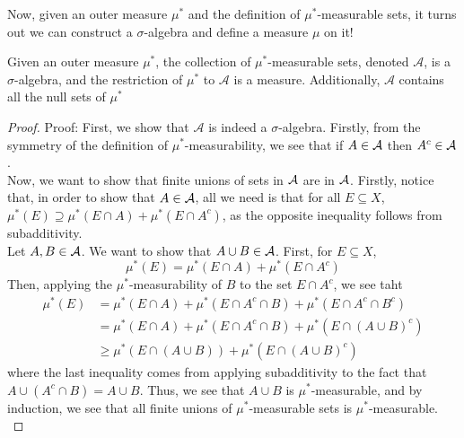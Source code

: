 
Now, given an outer measure $\mu^{*}$ and the definition of $\mu^{*}$-measurable sets, it turns out we can construct a $\sigma$-algebra and define a measure $\mu$ on it!

\begin{theorem}
    Given an outer measure $\mu^{*}$, the collection of $\mu^{*}$-measurable sets, denoted $\mathcal{A}$, is a $\sigma$-algebra, and the restriction of $\mu^{*}$ to $\mathcal{A}$ is a measure. Additionally, $\mathcal{A}$ contains all the null sets of $\mu^{*}$
\end{theorem}
\begin{proof}{Proof:}
    First, we show that $\mathcal{A}$ is indeed a $\sigma$-algebra. Firstly, from the symmetry of the definition of $\mu^{*}$-measurability, we see that if $A \in \cal{A}$ then $A^{c} \in \cal{A}$.\\
    
    Now, we want to show that finite unions of sets in $\cal{A}$ are in $\cal{A}$. Firstly, notice that, in order to show that $A \in \cal{A}$, all we need is that for all $E \subseteq X$, $\mu^{*}(E) \supseteq \mu^{*}(E \cap A) + \mu^{*}(E \cap A^{c})$, as the opposite inequality follows from subadditivity.\\

    Let $A, B \in \cal{A}$. We want to show that $A \cup B \in \cal{A}$. First, for $E \subseteq X$, 
    \[ \mu^{*}(E) = \mu^{*}(E \cap A) + \mu^{*}(E \cap A^{c}) \]
    Then, applying the $\mu^{*}$-measurability of $B$ to the set $E \cap A^{c}$, we see taht
    \begin{align*}
        \mu^{*}(E) &= \mu^{*}(E \cap A) + \mu^{*}(E \cap A^{c} \cap B) + \mu^{*}(E \cap A^{c} \cap B^{c})\\
        &= \mu^{*}(E \cap A) + \mu^{*}(E \cap A^{c} \cap B) + \mu^{*}(E \cap (A \cup B)^{c})\\
        &\geq \mu^{*}(E \cap (A \cup B)) + \mu^{*}(E \cap (A \cup B)^{c})
    \end{align*}
    where the last inequality comes from applying subadditivity to the fact that $A \cup (A^{c} \cap B) = A \cup B$. Thus, we see that $A \cup B$ is $\mu^{*}$-measurable, and by induction, we see that all finite unions of $\mu^{*}$-measurable sets is $\mu^{*}$-measurable.\\


\end{proof}

